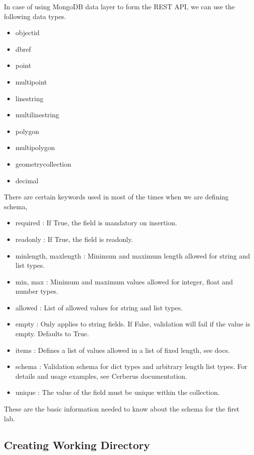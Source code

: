 \documentclass{article}
\begin{document}
\clearpage
In case of using MongoDB data layer to form the REST API, we can use 
the following data types.

\begin{itemize}
    
\item objectid
\item dbref
\item point
\item multipoint
\item linestring
\item multilinestring
\item polygon
\item multipolygon
\item geometrycollection
\item decimal 
\end{itemize}

There are certain keywords used in most of the times when we are
defining schema,

\begin{itemize}
    
\item required : If True, the field is mandatory on insertion.
\item readonly : If True, the field is readonly.
\item minlength, maxlength : Minimum and maximum length allowed for
  string and list types.
\item min, max : Minimum and maximum values allowed for integer, float
  and number types.
\item allowed : List of allowed values for string and list types.
\item empty : Only applies to string fields. If False, validation will
  fail if the value is empty. Defaults to True.
\item items : Defines a list of values allowed in a list of fixed
  length, see docs.
\item schema : Validation schema for dict types and arbitrary length
  list types. For details and usage examples, see Cerberus
  documentation.
\item unique  : The value of the field must be unique within the collection.
\end{itemize}

These are the basic information needed to know about the schema for
the first lab.

\subsection{Creating Working Directory}
\end{document}
